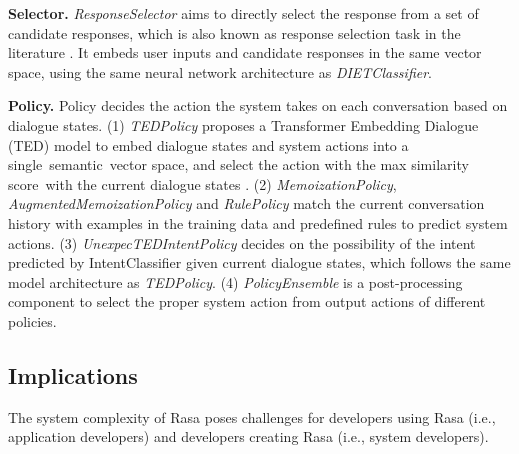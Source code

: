 \textbf{Selector.} \textit{ResponseSelector} aims to directly select the response from a set of candidate responses, which is also known as response selection task in the literature \cite{chaudhuri-etal-2018-improving}. It embeds user inputs and candidate responses in the same vector space, using the same neural network architecture as \textit{DIETClassifier}.

\textbf{Policy.} Policy decides the action the system takes on each conversation based on dialogue states.
(1) \textit{TEDPolicy} proposes a Transformer Embedding Dialogue (TED) model to embed dialogue states and system actions into a single~semantic~vector space, and select the action with the max similarity score~with the current dialogue states \cite{TED}.
(2) \textit{MemoizationPolicy}, \textit{AugmentedMemoizationPolicy} and \textit{RulePolicy} match the current conversation history with examples in the training data and predefined rules to predict system actions.
(3) \textit{UnexpecTEDIntentPolicy} decides on the possibility of the intent predicted by IntentClassifier given current dialogue states, which follows the same model architecture as \textit{TEDPolicy}.
(4) \textit{PolicyEnsemble} is a post-processing component to select the proper system action from output actions of different policies. 


\subsection{Implications}

The system complexity of Rasa poses challenges for developers using Rasa (i.e., application developers) and developers creating Rasa (i.e., system developers).

